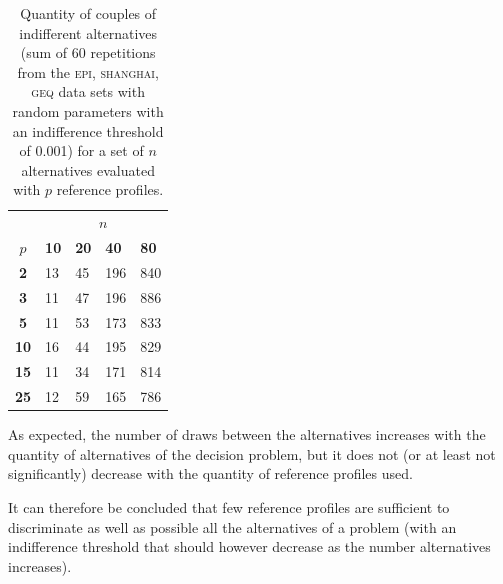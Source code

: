 \begin{table}[h]
    \centering
    \begin{tabular}{c @{\hskip 0.5cm} l l l l}
        \toprule
         & \multicolumn{4}{c}{\bf $n$} \\
         \cmidrule{2-5}
         \bf $p$ & \bf 10  & \bf 20  &  \bf 40    &  \bf  80  \\
        \midrule
         \bf 2  &   13 &  45 & 196 & 840 \\
         \bf 3  &   11 &  47 & 196 & 886 \\
         \bf 5  &   11 &  53 & 173 & 833 \\
         \bf 10 &   16 &  44 & 195 & 829 \\
         \bf 15 &   11 &  34 & 171 & 814 \\
         \bf 25 &   12 &  59 & 165 & 786 \\
        \bottomrule
    \end{tabular}
    \caption{Quantity of couples of indifferent alternatives (sum of 60 repetitions from the \textsc{epi}, \textsc{shanghai}, \textsc{geq} data sets with random parameters with an indifference threshold of 0.001) for a set of $n$ alternatives evaluated with $p$ reference profiles.}
    \label{tbl:referenced_PII_draws}
\end{table}




As expected, the number of draws between the alternatives increases with the quantity of alternatives of the decision problem, but it does not (or at least not significantly) decrease with the quantity of reference profiles used.

It can therefore be concluded that few reference profiles are sufficient to discriminate as well as possible all the alternatives of a problem (with an indifference threshold that should however decrease as the number alternatives increases).

